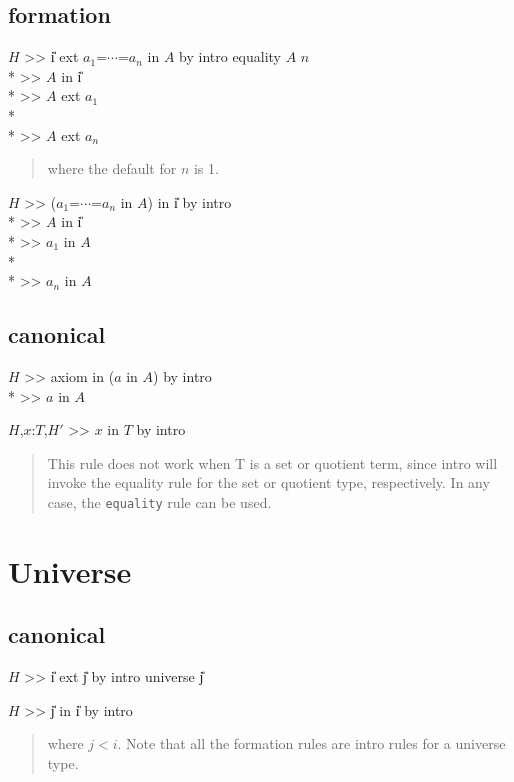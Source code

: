 \subsection*{formation}
\goal $H$ >> \U{i} ext $a_1$=$\cdots$=$a_n$ in $A$ by intro equality $A$ $n$ \\*
\subgoal >> $A$ in \U{i} \\*
\subgoal >> $A$ ext $a_1$ \\*
\subgoal \vellipsis \\*
\subgoal >> $A$ ext $a_n$
\begin{quote}\rm
where the default for $n$ is 1.
\end{quote}

\goal $H$ >> ($a_1$=$\cdots$=$a_n$ in $A$) in \U{i} by intro \\*
\subgoal >> $A$ in \U{i} \\*
\subgoal >> $a_1$ in $A$ \\*
\subgoal \vellipsis \\*
\subgoal >> $a_n$ in $A$

\subsection*{canonical}
\goal $H$ >> axiom in ($a$ in $A$) by intro \\*
\subgoal >> $a$ in $A$

\goalskip

\goal $H$,$x$:$T$,$H'$ >> $x$ in $T$ by intro
\begin{quote}\rm
This rule does not work when T is a set or quotient term,
since intro will invoke the equality rule for the set or quotient type,
respectively.
In any case, the {\tt equality} rule can be used.
\end{quote}


\par

\section{Universe}
\subsection*{canonical}
\goal $H$ >> \U{i} ext \U{j} by intro universe \U{j}


\goalskip

\goal $H$ >> \U{j} in \U{i}  by intro
\begin{quote}\rm
where $j<i$.
Note that all the formation rules are intro rules for a universe type.
\end{quote}

